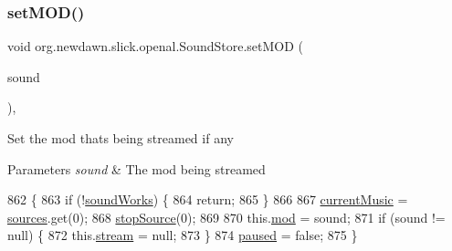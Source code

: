 \subsubsection{\texorpdfstring{set\+M\+O\+D()}{setMOD()}}
{\footnotesize\ttfamily void org.\+newdawn.\+slick.\+openal.\+Sound\+Store.\+set\+M\+OD (\begin{DoxyParamCaption}\item[{\mbox{\hyperlink{classorg_1_1newdawn_1_1slick_1_1openal_1_1_m_o_d_sound}{M\+O\+D\+Sound}}}]{sound }\end{DoxyParamCaption})\hspace{0.3cm}{\ttfamily [inline]}, {\ttfamily [package]}}

Set the mod thats being streamed if any


\begin{DoxyParams}{Parameters}
{\em sound} & The mod being streamed \\
\hline
\end{DoxyParams}

\begin{DoxyCode}
862                                 \{
863         \textcolor{keywordflow}{if} (!\mbox{\hyperlink{classorg_1_1newdawn_1_1slick_1_1openal_1_1_sound_store_ae563e9c1a01e333dc2350f1450f451fd}{soundWorks}}) \{
864             \textcolor{keywordflow}{return};
865         \}
866 
867         \mbox{\hyperlink{classorg_1_1newdawn_1_1slick_1_1openal_1_1_sound_store_a533d86a926110a3d75449fa186015f07}{currentMusic}} = \mbox{\hyperlink{classorg_1_1newdawn_1_1slick_1_1openal_1_1_sound_store_a3a2ffa73acd847102bb30140129c440b}{sources}}.get(0);
868         \mbox{\hyperlink{classorg_1_1newdawn_1_1slick_1_1openal_1_1_sound_store_abbc79b5bafc0b1e6108e028e8232f572}{stopSource}}(0);
869         
870         this.\mbox{\hyperlink{classorg_1_1newdawn_1_1slick_1_1openal_1_1_sound_store_acfae79fd86ae031150acd19e30894aaa}{mod}} = sound;
871         \textcolor{keywordflow}{if} (sound != null) \{
872             this.\mbox{\hyperlink{classorg_1_1newdawn_1_1slick_1_1openal_1_1_sound_store_a3529a80a2ca84a63d3bdc55194f52ac7}{stream}} = null;
873         \}
874         \mbox{\hyperlink{classorg_1_1newdawn_1_1slick_1_1openal_1_1_sound_store_a44c472fda007e17b19478fc3d77e04e3}{paused}} = \textcolor{keyword}{false};
875     \}
\end{DoxyCode}
\mbox{\label{classorg_1_1newdawn_1_1slick_1_1openal_1_1_sound_store_a432fd6f8e8dfa346013d313fa63fc44c}} 
